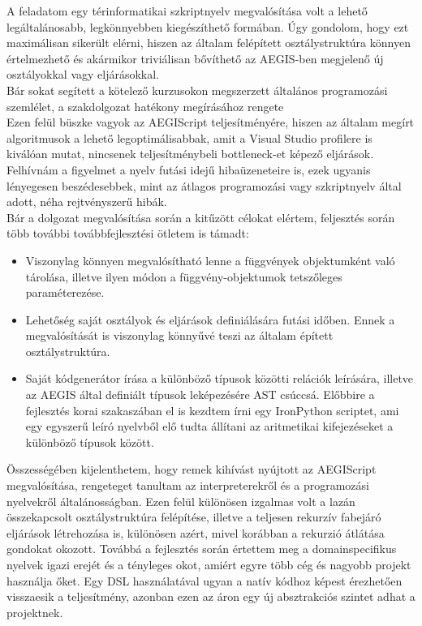 \documentclass[a4paper,12pt]{report}
\begin{document}
A feladatom egy térinformatikai szkriptnyelv megvalósítása volt a lehető legáltalánosabb, legkönnyebben kiegészíthető formában. Úgy gondolom, hogy ezt maximálisan sikerült elérni, hiszen az általam felépített osztálystruktúra könnyen értelmezhető és akármikor triviálisan bővíthető az AEGIS-ben megjelenő új osztályokkal vagy eljárásokkal. \\
Bár sokat segített a kötelező kurzusokon megszerzett általános programozási szemlélet, a szakdolgozat hatékony megírásához rengete \\
Ezen felül büszke vagyok az AEGIScript teljesítményére, hiszen az általam megírt algoritmusok a lehető legoptimálisabbak, amit a Visual Studio profilere is kiválóan mutat, nincsenek teljesítménybeli bottleneck-et képező eljárások. \\
Felhívnám a figyelmet a nyelv futási idejű hibaüzeneteire is, ezek ugyanis lényegesen beszédesebbek, mint az átlagos programozási vagy szkriptnyelv által adott, néha rejtvényszerű hibák.
\\

Bár a dolgozat megvalósítása során a kitűzött célokat elértem, feljesztés során több további továbbfejlesztési ötletem is támadt:
\begin{itemize}
	\item Viszonylag könnyen megvalósítható lenne a függvények objektumként való tárolása, illetve ilyen módon a függvény-objektumok tetszőleges paraméterezése.
	\item Lehetőség saját osztályok és eljárások definiálására futási időben. Ennek a megvalósítását is viszonylag könnyűvé teszi az általam épített osztálystruktúra.
	\item Saját kódgenerátor írása a különböző típusok közötti relációk leírására, illetve az AEGIS által definiált típusok leképezésére AST csúccsá. Előbbire a fejlesztés korai szakaszában el is kezdtem írni egy IronPython scriptet, ami egy egyszerű leíró nyelvből elő tudta állítani az aritmetikai kifejezéseket a különböző típusok között.
\end{itemize}

Összességében kijelenthetem, hogy remek kihívást nyújtott az AEGIScript megvalósítása, rengeteget tanultam az interpreterekről és a programozási nyelvekről általánosságban. Ezen felül különösen izgalmas volt a lazán összekapcsolt osztálystruktúra felépítése, illetve a teljesen rekurzív fabejáró eljárások létrehozása is, különösen azért, mivel korábban a rekurzió átlátása gondokat okozott.
Továbbá a fejlesztés során értettem meg a domainspecifikus nyelvek igazi erejét és a tényleges okot, amiért egyre több cég és nagyobb projekt használja őket. Egy DSL használatával ugyan a natív kódhoz képest érezhetően visszaesik a teljesítmény, azonban ezen az áron egy új absztrakciós szintet adhat a projektnek.
\end{document}
